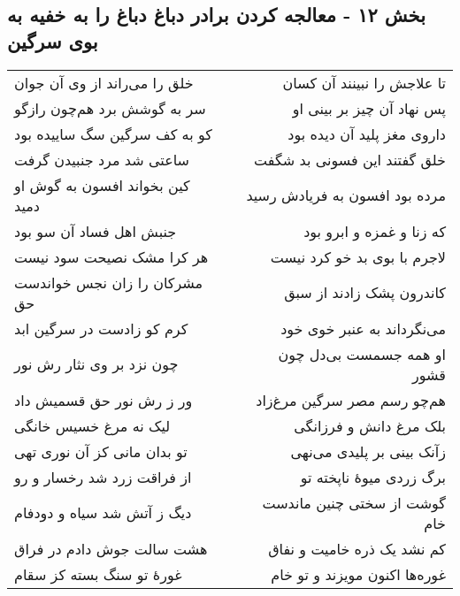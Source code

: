 \begin{center}
\section*{بخش ۱۲ - معالجه کردن برادر دباغ دباغ را به خفیه به بوی سرگین}
\label{sec:sh012}
\begin{longtable}{l p{0.5cm} r}
خلق را می‌راند از وی آن جوان
&&
تا علاجش را نبینند آن کسان
\\
سر به گوشش برد هم‌چون رازگو
&&
پس نهاد آن چیز بر بینی او
\\
کو به کف سرگین سگ ساییده بود
&&
داروی مغز پلید آن دیده بود
\\
ساعتی شد مرد جنبیدن گرفت
&&
خلق گفتند این فسونی بد شگفت
\\
کین بخواند افسون به گوش او دمید
&&
مرده بود افسون به فریادش رسید
\\
جنبش اهل فساد آن سو بود
&&
که زنا و غمزه و ابرو بود
\\
هر کرا مشک نصیحت سود نیست
&&
لاجرم با بوی بد خو کرد نیست
\\
مشرکان را زان نجس خواندست حق
&&
کاندرون پشک زادند از سبق
\\
کرم کو زادست در سرگین ابد
&&
می‌نگرداند به عنبر خوی خود
\\
چون نزد بر وی نثار رش نور
&&
او همه جسمست بی‌دل چون قشور
\\
ور ز رش نور حق قسمیش داد
&&
هم‌چو رسم مصر سرگین مرغ‌زاد
\\
لیک نه مرغ خسیس خانگی
&&
بلک مرغ دانش و فرزانگی
\\
تو بدان مانی کز آن نوری تهی
&&
زآنک بینی بر پلیدی می‌نهی
\\
از فراقت زرد شد رخسار و رو
&&
برگ زردی میوهٔ ناپخته تو
\\
دیگ ز آتش شد سیاه و دودفام
&&
گوشت از سختی چنین ماندست خام
\\
هشت سالت جوش دادم در فراق
&&
کم نشد یک ذره خامیت و نفاق
\\
غورهٔ تو سنگ بسته کز سقام
&&
غوره‌ها اکنون مویزند و تو خام
\\
\end{longtable}
\end{center}
